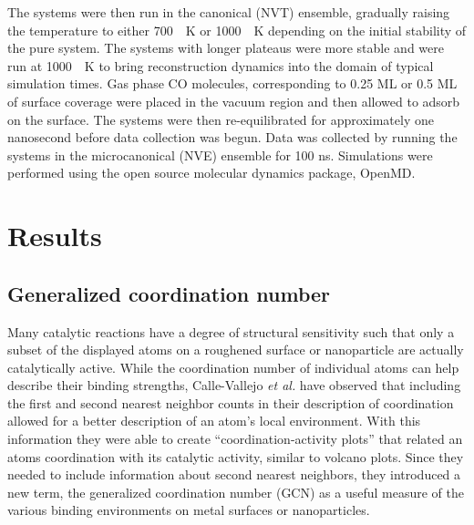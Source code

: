 The systems were then run in the canonical (NVT) ensemble, gradually raising
the temperature to either 700\ ~K or 1000\ ~K depending on the initial
stability of the pure system.  The systems with longer plateaus were more
stable and were run at 1000\ ~K to bring reconstruction dynamics into the
domain of typical simulation times.  Gas phase CO molecules, corresponding to
0.25 ML or 0.5 ML of surface coverage were placed in the vacuum region and then
allowed to adsorb on the surface. The systems were then re-equilibrated for
approximately one nanosecond before data collection was begun.  Data was
collected by running the systems in the microcanonical (NVE) ensemble for 100
ns.  Simulations were performed using the open source molecular dynamics
package, OpenMD.\citep{Fennell:2006xq, Meineke:2005pt, openmd} 

\section{Results}


\subsection{Generalized coordination number}
Many catalytic reactions have a degree of structural sensitivity such that only
a subset of the displayed atoms on a roughened surface or nanoparticle are
actually catalytically active. While the coordination number of individual
atoms can help describe their binding strengths, Calle-Vallejo {\it et al.}
have observed that including the first and second nearest neighbor counts in
their description of coordination allowed for a better description of an atom's
local environment.\citep{Calle-Vallejo:2015qq} With this information 
they were able to create ``coordination-activity plots'' that
related an atoms coordination with its catalytic activity, similar to volcano plots. Since they needed to
include information about second nearest neighbors, they introduced a new term,
the generalized coordination number (GCN) as a useful measure of the various
binding environments on metal surfaces or nanoparticles. 

